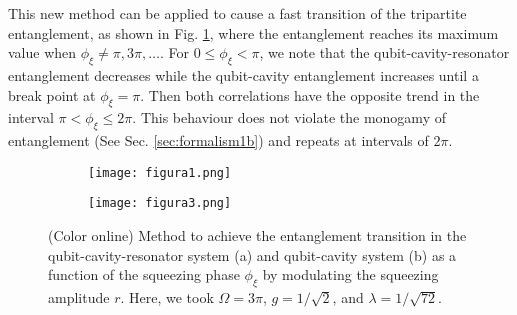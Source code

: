 This new method can be applied to cause a fast transition of the tripartite entanglement, as shown in Fig. \ref{fig1a}, where the entanglement reaches its maximum value when $\phi_{\xi}\neq \pi, 3\pi, \ldots$. For $0\leq \phi_{\xi} < \pi$, we note that the qubit-cavity-resonator entanglement decreases while the qubit-cavity entanglement increases until a break point at $\phi_{\xi}=\pi$. Then both correlations have the opposite trend in the interval $\pi< \phi_{\xi}\leq2\pi$. This behaviour does not violate the monogamy of entanglement (See Sec. \ref{sec:formalism1b}) and repeats at intervals of $2\pi$. 

\begin{figure}[h!]

\begin{subfigure}{\textwidth}
\texttt{[image: figura1.png]}
\caption{}
\label{fig1a}
\end{subfigure}

\bigskip

\begin{subfigure}{\textwidth}
\texttt{[image: figura3.png]}
\caption{}
\label{fig1b}
\end{subfigure}

\caption{(Color online) Method to achieve the entanglement transition in the qubit-cavity-resonator system (a) and qubit-cavity system (b) as a function of the squeezing phase $\phi_{\xi}$ by modulating the squeezing amplitude $r$. Here, we took $\Omega=3\pi$, $g=1/\sqrt{2}$, and $\lambda=1/\sqrt{72}$.}
\label{fig1}

\end{figure}

